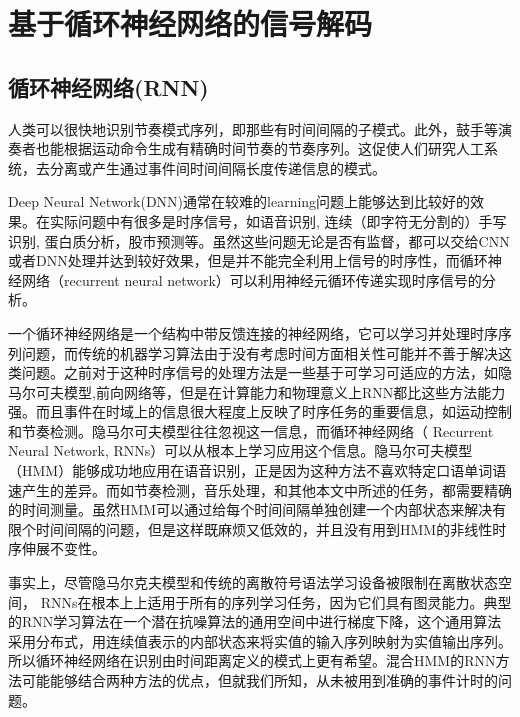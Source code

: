 \chapter{基于循环神经网络的信号解码}

\section{循环神经网络(RNN)}

人类可以很快地识别节奏模式序列，即那些有时间间隔的子模式。此外，鼓手等演奏者也能根据运动命令生成有精确时间节奏的节奏序列。这促使人们研究人工系统，去分离或产生通过事件间时间间隔长度传递信息的模式。

Deep Neural Network(DNN)通常在较难的learning问题上能够达到比较好的效果。在实际问题中有很多是时序信号，如语音识别, 连续（即字符无分割的）手写识别, 蛋白质分析，股市预测等。虽然这些问题无论是否有监督，都可以交给CNN或者DNN处理并达到较好效果\cite{abdel2014convolutional,lecun1995convolutional,ciresan2011convolutional,lecun1994word ,lauer2007trainable,baldi1996hybrid,zhu2014stock}，但是并不能完全利用上信号的时序性，而循环神经网络（recurrent neural network）可以利用神经元循环传递实现时序信号的分析。

一个循环神经网络是一个结构中带反馈连接的神经网络，它可以学习并处理时序序列问题，而传统的机器学习算法由于没有考虑时间方面相关性可能并不善于解决这类问题。之前对于这种时序信号的处理方法是一些基于可学习可适应的方法，如隐马尔可夫模型\cite{eddy1996hidden},前向网络等，但是在计算能力和物理意义上RNN都比这些方法能力强。而且事件在时域上的信息很大程度上反映了时序任务的重要信息，如运动控制和节奏检测。隐马尔可夫模型往往忽视这一信息，而循环神经网络（ Recurrent Neural Network, RNNs）可以从根本上学习应用这个信息。隐马尔可夫模型（HMM）能够成功地应用在语音识别，正是因为这种方法不喜欢特定口语单词语速产生的差异。而如节奏检测，音乐处理，和其他本文中所述的任务，都需要精确的时间测量。虽然HMM可以通过给每个时间间隔单独创建一个内部状态来解决有限个时间间隔的问题，但是这样既麻烦又低效的，并且没有用到HMM的非线性时序伸展不变性。

事实上，尽管隐马尔克夫模型和传统的离散符号语法学习设备被限制在离散状态空间， RNNs在根本上上适用于所有的序列学习任务，因为它们具有图灵能力\cite{siegelmann1995computational}。典型的RNN学习算法在一个潜在抗噪算法的通用空间中进行梯度下降\cite{pearlmutter1995gradient}，这个通用算法采用分布式，用连续值表示的内部状态来将实值的输入序列映射为实值输出序列。所以循环神经网络在识别由时间距离定义的模式上更有希望。混合HMM的RNN方法\cite{bengio1995input}可能能够结合两种方法的优点，但就我们所知，从未被用到准确的事件计时的问题。

